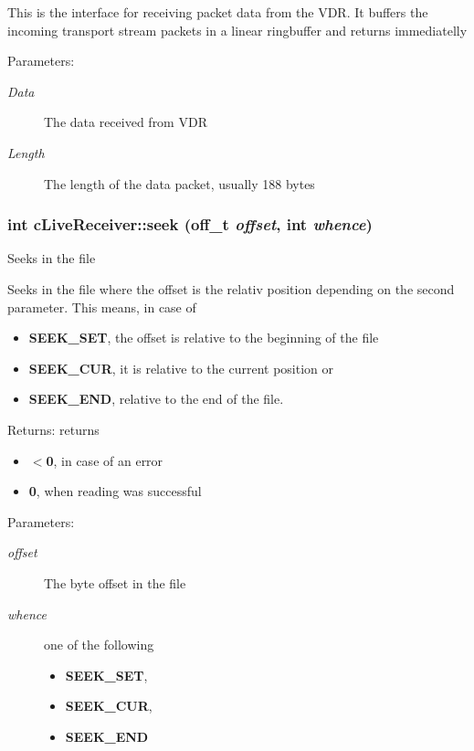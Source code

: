 This is the interface for receiving packet data from the VDR. It buffers the incoming transport stream packets in a linear ringbuffer and returns immediatelly \begin{Desc}
\item[Parameters:]
\begin{description}
\item[{\em Data}]The data received from VDR \item[{\em Length}]The length of the data packet, usually 188 bytes \end{description}
\end{Desc}
\hypertarget{classcLiveReceiver_efb4156ef247773873dee42053e94edf}{
\subsubsection[{seek}]{\setlength{\rightskip}{0pt plus 5cm}int cLiveReceiver::seek (off\_\-t {\em offset}, \/  int {\em whence})}}
\label{classcLiveReceiver_efb4156ef247773873dee42053e94edf}


Seeks in the file

Seeks in the file where the offset is the relativ position depending on the second parameter. This means, in case of

\begin{itemize}
\item {\bf SEEK\_\-SET}, the offset is relative to the beginning of the file\item {\bf SEEK\_\-CUR}, it is relative to the current position or\item {\bf SEEK\_\-END}, relative to the end of the file.\end{itemize}


\begin{Desc}
\item[Returns:]returns\begin{itemize}
\item {\bf $<$0}, in case of an error\item {\bf 0}, when reading was successful\end{itemize}
\end{Desc}
\begin{Desc}
\item[Parameters:]
\begin{description}
\item[{\em offset}]The byte offset in the file \item[{\em whence}]one of the following\begin{itemize}
\item {\bf SEEK\_\-SET},\item {\bf SEEK\_\-CUR},\item {\bf SEEK\_\-END} \end{itemize}
\end{description}
\end{Desc}
 

